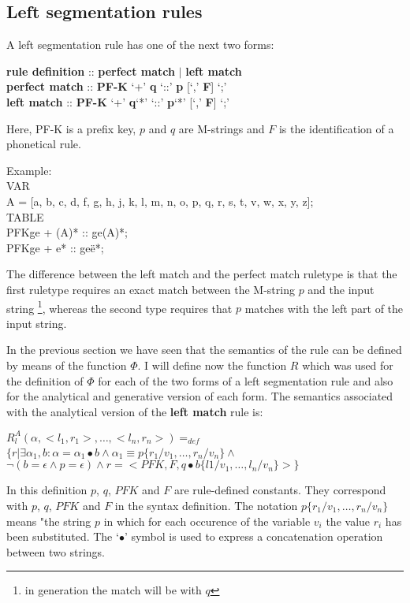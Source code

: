 \subsection{Left segmentation rules}
A left segmentation rule has one of the next two forms:
\small
\begin{code}
{\bf rule definition } :: {\bf perfect match} $|$ {\bf left match }\\
{\bf perfect match } :: {\bf PF-K} `+' {\bf q}  `::' {\bf p} [`,' {\bf F}] `;'\\
{\bf left match } :: {\bf PF-K} `+' {\bf q}`*'  `::' {\bf p}`*' [`,' {\bf F}] `;'
\end{code}
\normalsize
Here, PF-K is a prefix key, $p$ and $q$ are M-strings and $F$ is the
identification of a phonetical rule.

\small
\begin{code}
Example: \\
\>VAR\\
\>\>A = [a, b, c, d, f, g, h, j, k, l, m, n, o, p, q, r, s, t, v, w, x, y, z];\\
\>TABLE\\
\>\>PFKge + (A)* :: ge(A)*;\\
\>\>PFKge + e* :: ge\"{e}*;\\
\end{code}
\normalsize

The difference between the left match and the perfect match ruletype is that
the first ruletype requires
an exact match between the M-string $p$ and the input string \footnote{in
generation the match will be with $q$}, whereas the second type requires that
$p$ matches with the left part of the input string.

In the previous section
we have seen that the semantics of the rule can be defined by means of the
function $\Phi$. I will define now the function $R$ which was used for the
definition of $\Phi$ for each of the two forms of a left segmentation rule
and also for the analytical and generative version of each form.
The semantics associated with the analytical version of the
{\bf left match} rule is:
\small
\begin{code}
$R^{A}_{l}(\alpha,<l_{1},r_{1}>, \ldots ,<l_{n},r_{n}>) =_{def}$\\
\>$\{ r | \exists \alpha_{1}, b : \alpha = \alpha_{1}\bullet b \wedge \alpha_{1} \equiv p\{r_{1}/v_{1},\ldots,r_{n}/v_{n}\} \wedge$\
\
\>$\neg( b = \epsilon \wedge p = \epsilon ) \wedge r = <PFK, F, q\bullet b\{l{1}/v_{1},\ldots,l_{n}/v_{n}\}> \}$\\
\end{code}
\normalsize
In this definition $p$, $q$, $PFK$ and $F$ are rule-defined
constants. They correspond with $p$, $q$, $PFK$ and $F$ in the
syntax definition.
The notation $p\{r_{1}/v_{1},\ldots,r_{n}/v_{n}\}$ means "the string $p$
in which for each occurence of the variable $v_{i}$ the value $r_{i}$ has been
substituted. The `$\bullet$' symbol is used to express a concatenation operation between
two strings.

